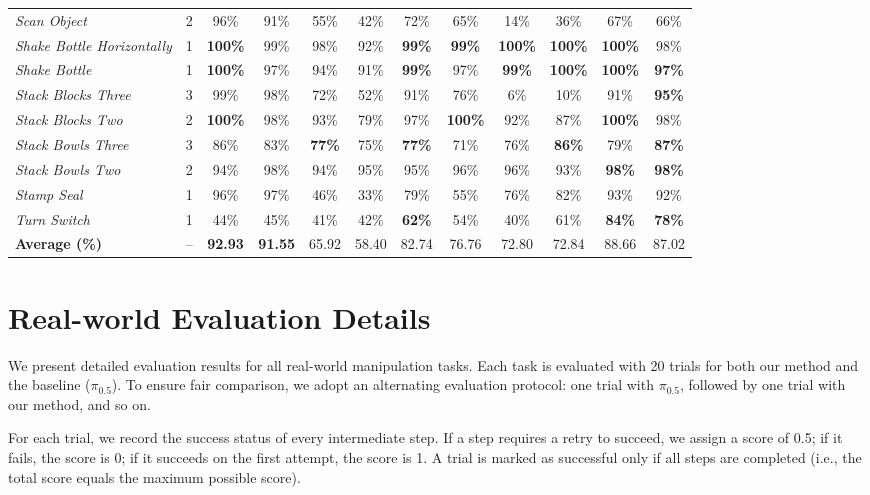 \documentclass[onecolumn]{robbyant}           %
\begin{document}
\begin{table}[t]
{\begin{tabular}{l c cc cc cc cc cc}
\textit{Scan Object} & 2 & 96\% & 91\% & 55\% & 42\% & 72\% & 65\% & 14\% & 36\% & 67\% & 66\% \\
\textit{Shake Bottle Horizontally} & 1 & \textbf{100\%} & 99\% & 98\% & 92\% & \textbf{99\%} & \textbf{99\%} & \textbf{100\%} & \textbf{100\%} & \textbf{100\%} & 98\% \\
\textit{Shake Bottle} & 1 & \textbf{100\%} & 97\% & 94\% & 91\% & \textbf{99\%} & 97\% & \textbf{99\%} & \textbf{100\%} & \textbf{100\%} & \textbf{97\%} \\
\textit{Stack Blocks Three} & 3 & 99\% & 98\% & 72\% & 52\% & 91\% & 76\% & 6\% & 10\% & 91\% & \textbf{95\%} \\
\textit{Stack Blocks Two} & 2 & \textbf{100\%} & 98\% & 93\% & 79\% & 97\% & \textbf{100\%} & 92\% & 87\% & \textbf{100\%} & 98\% \\
\textit{Stack Bowls Three} & 3 & 86\% & 83\% & \textbf{77\%} & 75\% & \textbf{77\%} & 71\% & 76\% & \textbf{86\%} & 79\% & \textbf{87\%} \\
\textit{Stack Bowls Two} & 2 & 94\% & 98\% & 94\% & 95\% & 95\% & 96\% & 96\% & 93\% & \textbf{98\%} & \textbf{98\%} \\
\textit{Stamp Seal} & 1 & 96\% & 97\% & 46\% & 33\% & 79\% & 55\% & 76\% & 82\% & 93\% & 92\% \\
\textit{Turn Switch} & 1 & 44\% & 45\% & 41\% & 42\% & \textbf{62\%} & 54\% & 40\% & 61\% & \textbf{84\%} & \textbf{78\%} \\
\midrule
\textbf{Average (\%)} & -- & \textbf{92.93} & \textbf{91.55} & 65.92 & 58.40 & 82.74 & 76.76 & 72.80 & 72.84 & 88.66 & 87.02 \\
\bottomrule
\end{tabular}%
}
\vspace{-5pt}
\end{table}



\section{Real-world Evaluation Details}\label{appendix:real_world_details}

We present detailed evaluation results for all real-world manipulation tasks. Each task is evaluated with 20 trials for both our method and the baseline ($\pi_{0.5}$). To ensure fair comparison, we adopt an alternating evaluation protocol: one trial with $\pi_{0.5}$, followed by one trial with our method, and so on.

For each trial, we record the success status of every intermediate step. If a step requires a retry to succeed, we assign a score of 0.5; if it fails, the score is 0; if it succeeds on the first attempt, the score is 1. A trial is marked as successful only if all steps are completed (i.e., the total score equals the maximum possible score).
\end{document}
